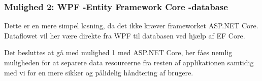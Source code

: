 \subsubsection{Mulighed 2: WPF -\g Entity Framework Core -\g database}
Dette er en mere simpel løsning, da det ikke kræver frameworket ASP.NET Core. Dataflowet vil her være direkte fra WPF til databasen ved hjælp af EF Core. 

Det besluttes at gå med mulighed 1 med ASP.NET Core, her fåes nemlig muligheden for at separere data resourcerne fra resten af applikationen samtidig med vi for en mere sikker og pålidelig håndtering af brugere.




